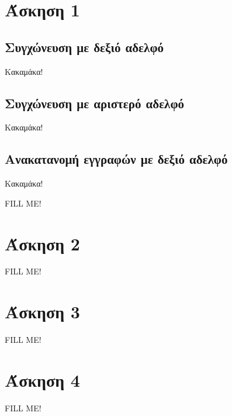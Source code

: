\documentclass[a4paper,11pt]{article}
\begin{document}
\renewcommand{\labelenumi}{\roman{enumi})}
\renewcommand{\labelenumii}{(\arabic{enumii})}



\section{Άσκηση 1} \setcounter{section}{1}
\subsection {Συγχώνευση με δεξιό αδελφό}
Κακαμάκα!
\subsection {Συγχώνευση με αριστερό αδελφό}
Κακαμάκα!
\subsection {Ανακατανομή εγγραφών με δεξιό αδελφό}
Κακαμάκα!

FILL ME!


\section{Άσκηση 2} \setcounter{section}{1}

FILL ME!


\section{Άσκηση 3} \setcounter{section}{1}

FILL ME!


\section{Άσκηση 4} \setcounter{section}{1}

FILL ME!

\end{document}

